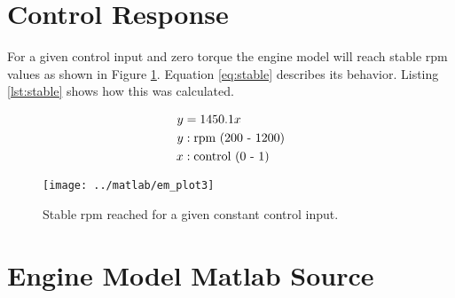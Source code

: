 \documentclass{article}
\begin{document}



\clearpage
\section{Control Response}
\label{app:contrpm}

For a given control input and zero torque the engine model will
reach stable rpm values as shown in Figure \ref{fig:stable}.
Equation \ref{eq:stable} describes its behavior.
Listing \ref{lst:stable} shows how this was calculated.

\begin{align}
y &= 1450.1 x \label{eq:stable} \\
	y &: \text{rpm (200 - 1200)} \notag \\
	x &: \text{control (0 - 1)} \notag
\end{align}

\begin{figure}[htbp!]
\begin{center}
\texttt{[image: ../matlab/em\_plot3]}
\end{center}
\caption{Stable rpm reached for a given constant control input.}
\label{fig:stable}
\end{figure}

\clearpage


\clearpage
\section{Engine Model Matlab Source}
\label{app:em_matlab}





\clearpage

\end{document}
